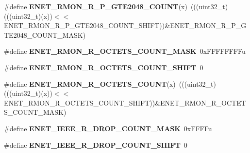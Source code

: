 \begin{DoxyCompactItemize}
\item 
\#define {\bfseries E\+N\+E\+T\+\_\+\+R\+M\+O\+N\+\_\+\+R\+\_\+\+P\+\_\+\+G\+T\+E2048\+\_\+\+C\+O\+U\+NT}(x)~(((uint32\+\_\+t)(((uint32\+\_\+t)(x))$<$$<$E\+N\+E\+T\+\_\+\+R\+M\+O\+N\+\_\+\+R\+\_\+\+P\+\_\+\+G\+T\+E2048\+\_\+\+C\+O\+U\+N\+T\+\_\+\+S\+H\+I\+FT))\&E\+N\+E\+T\+\_\+\+R\+M\+O\+N\+\_\+\+R\+\_\+\+P\+\_\+\+G\+T\+E2048\+\_\+\+C\+O\+U\+N\+T\+\_\+\+M\+A\+SK)\hypertarget{group__ENET__Register__Masks_gaa844aadcdf419a7c56585c6b46e08652}{}\label{group__ENET__Register__Masks_gaa844aadcdf419a7c56585c6b46e08652}

\item 
\#define {\bfseries E\+N\+E\+T\+\_\+\+R\+M\+O\+N\+\_\+\+R\+\_\+\+O\+C\+T\+E\+T\+S\+\_\+\+C\+O\+U\+N\+T\+\_\+\+M\+A\+SK}~0x\+F\+F\+F\+F\+F\+F\+F\+Fu\hypertarget{group__ENET__Register__Masks_ga31948c93e2594b779db5084f7c65a294}{}\label{group__ENET__Register__Masks_ga31948c93e2594b779db5084f7c65a294}

\item 
\#define {\bfseries E\+N\+E\+T\+\_\+\+R\+M\+O\+N\+\_\+\+R\+\_\+\+O\+C\+T\+E\+T\+S\+\_\+\+C\+O\+U\+N\+T\+\_\+\+S\+H\+I\+FT}~0\hypertarget{group__ENET__Register__Masks_ga048e6dcb8662f710b44101a65f6bc6c8}{}\label{group__ENET__Register__Masks_ga048e6dcb8662f710b44101a65f6bc6c8}

\item 
\#define {\bfseries E\+N\+E\+T\+\_\+\+R\+M\+O\+N\+\_\+\+R\+\_\+\+O\+C\+T\+E\+T\+S\+\_\+\+C\+O\+U\+NT}(x)~(((uint32\+\_\+t)(((uint32\+\_\+t)(x))$<$$<$E\+N\+E\+T\+\_\+\+R\+M\+O\+N\+\_\+\+R\+\_\+\+O\+C\+T\+E\+T\+S\+\_\+\+C\+O\+U\+N\+T\+\_\+\+S\+H\+I\+FT))\&E\+N\+E\+T\+\_\+\+R\+M\+O\+N\+\_\+\+R\+\_\+\+O\+C\+T\+E\+T\+S\+\_\+\+C\+O\+U\+N\+T\+\_\+\+M\+A\+SK)\hypertarget{group__ENET__Register__Masks_ga9c8d0f6539dace79465f4e616914072c}{}\label{group__ENET__Register__Masks_ga9c8d0f6539dace79465f4e616914072c}

\item 
\#define {\bfseries E\+N\+E\+T\+\_\+\+I\+E\+E\+E\+\_\+\+R\+\_\+\+D\+R\+O\+P\+\_\+\+C\+O\+U\+N\+T\+\_\+\+M\+A\+SK}~0x\+F\+F\+F\+Fu\hypertarget{group__ENET__Register__Masks_ga40514ce83587f1cd466ecbe7b007e571}{}\label{group__ENET__Register__Masks_ga40514ce83587f1cd466ecbe7b007e571}

\item 
\#define {\bfseries E\+N\+E\+T\+\_\+\+I\+E\+E\+E\+\_\+\+R\+\_\+\+D\+R\+O\+P\+\_\+\+C\+O\+U\+N\+T\+\_\+\+S\+H\+I\+FT}~0\hypertarget{group__ENET__Register__Masks_gadfe517b4bb1358a8934a04c3bfe94d9d}{}\label{group__ENET__Register__Masks_gadfe517b4bb1358a8934a04c3bfe94d9d}


\end{DoxyCompactItemize}
